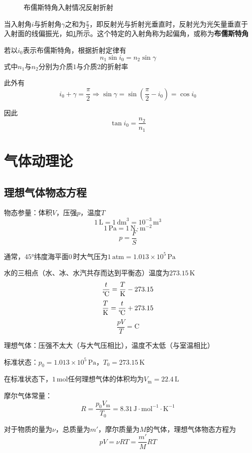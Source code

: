 \documentclass[12pt, a4paper, twoside]{ctexbook}
\begin{document}
\begin{figure}[H]
\begin{minipage}{0.48\linewidth}
        \caption{布儒斯特角入射情况反射折射}
        \label{fig:布儒斯特角入射情况反射折射}
    \end{minipage}
\end{figure}

当入射角$i$与折射角$\gamma$之和为$\frac{\pi}{2}$，即反射光与折射光垂直时，反射光为光矢量垂直于入射面的线偏振光，如\textcolor{blue}{\cref{fig:布儒斯特角入射情况反射折射}}所示。这个特定的入射角称为起偏角，或称为\textbf{布儒斯特角}

若以$i_0$表示布儒斯特角，根据折射定律有
$$
n_1\sin i_0=n_2\sin\gamma
$$
式中$n_1$与$n_2$分别为介质$1$与介质$2$的折射率

此外有
$$
i_0+\gamma=\frac{\pi}{2} \Rightarrow \sin\gamma=\sin\left(\frac{\pi}{2}-i_0\right)=\cos i_0
$$

因此
$$
\tan i_0=\frac{n_2}{n_1}
$$
\chapter{气体动理论}
\newpage
\section{理想气体物态方程}
{\sonti 物态参量}：体积$V$，压强$p$，温度$T$
$$
1\,\mathrm{L}=1\,\mathrm{dm}^3=10^{-3}\,\mathrm{m}^3
$$
$$
1\,\mathrm{Pa}=1\,\mathrm{N}\cdot\mathrm{m}^{-2}
$$
$$
p=\frac{F}{S}
$$

通常，$45°$纬度海平面$0\,$\textcelsius 时大气压为$1\,\mathrm{atm}=1.013\times10^5\,\mathrm{Pa}$

{\sonti 水的三相点}（水、冰、水汽共存而达到平衡态）温度为$273.15\,\mathrm{K}$
$$
\frac{t}{\text{\textcelsius}}=\frac{T}{\mathrm{K}}-273.15
$$
$$
\frac{T}{\mathrm{K}}=\frac{t}{\text{\textcelsius}}+273.15
$$
$$
\frac{pV}{T}=\mathrm{C}
$$

{\sonti 理想气体}：压强不太大（与大气压相比），温度不太低（与室温相比）

{\sonti 标准状态}：$p_0=1.013\times 10^5\,\mathrm{Pa}$，$T_0=273.15\,\mathrm{K}$

在标准状态下，$1\,\mathrm{mol}$任何理想气体的体积均为$V_\mathrm{m}=22.4\,\mathrm{L}$

{\sonti 摩尔气体常量}：
$$
R=\frac{p_0V_\mathrm{m}}{T_0}=8.31\,\mathrm{J}\cdot\mathrm{mol}^{-1}\cdot\mathrm{K}^{-1}
$$

对于物质的量为$\nu$，总质量为$m'$，摩尔质量为$M$的气体，理想气体物态方程为
$$
pV=\nu RT=\frac{m'}{M}RT
$$
\end{document}
